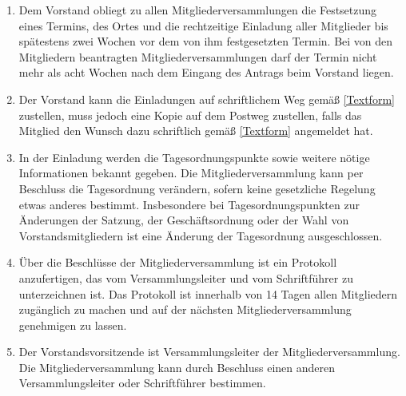 \documentclass[fontsize=12pt,paper=a4,pagesize,headings=small]{scrartcl}
\begin{document}
\begin{enumerate}
    \item Dem Vorstand obliegt zu allen Mitgliederversammlungen die
    Festsetzung eines Termins, des Ortes und die rechtzeitige Einladung
    aller Mitglieder bis spätestens zwei Wochen vor dem von ihm
    festgesetzten Termin. Bei von den Mitgliedern beantragten
    Mitgliederversammlungen darf der Termin nicht mehr als acht Wochen
    nach dem Eingang des Antrags beim Vorstand liegen.

    \item Der Vorstand kann die Einladungen auf schriftlichem Weg gemäß
    \ref{Textform} zustellen, muss jedoch eine Kopie auf dem
    Postweg zustellen, falls das Mitglied den Wunsch dazu schriftlich
    gemäß \ref{Textform} angemeldet hat.

    \item In der Einladung werden die Tagesordnungspunkte sowie weitere
    nötige Informationen bekannt gegeben. Die Mitgliederversammlung
    kann per Beschluss die Tagesordnung verändern, sofern keine
    gesetzliche Regelung etwas anderes bestimmt. Insbesondere bei
    Tagesordnungspunkten zur Änderungen der Satzung, der
    Geschäftsordnung oder der Wahl von Vorstandsmitgliedern ist eine
    Änderung der Tagesordnung ausgeschlossen.

    \item Über die Beschlüsse der Mitgliederversammlung ist ein
    Protokoll anzufertigen, das vom Versammlungsleiter und vom
    Schriftführer zu unterzeichnen ist. Das Protokoll ist innerhalb von
    14 Tagen allen Mitgliedern zugänglich zu machen und auf der
    nächsten Mitgliederversammlung genehmigen zu lassen.

    \item Der Vorstandsvorsitzende ist Versammlungsleiter der
    Mitgliederversammlung. Die Mitgliederversammlung kann durch
    Beschluss einen anderen Versammlungsleiter oder Schriftführer
    bestimmen.
\end{enumerate}
\end{document}
